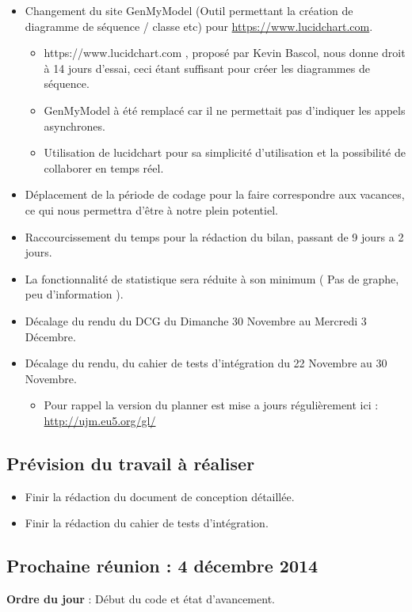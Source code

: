 \documentclass[12pt,a4paper]{article}
\begin{document}
\begin{itemize}[label = $\ast$]
	\item Changement du site GenMyModel (Outil permettant la création de diagramme de séquence / classe etc)  pour \url{https://www.lucidchart.com}.
	\begin{itemize}[label = $\circ$]
		\item https://www.lucidchart.com , proposé par Kevin Bascol, nous donne droit à 14 jours d'essai, ceci étant suffisant pour créer les diagrammes de séquence.
		\item GenMyModel à été remplacé car il ne permettait pas d'indiquer les appels asynchrones.
		\item Utilisation de lucidchart pour sa simplicité d'utilisation et la possibilité de collaborer en temps réel.
	\end{itemize}
	\item Déplacement de la période de codage pour la faire correspondre aux vacances, ce qui nous permettra d'être à notre plein potentiel.
	\item Raccourcissement du temps pour la rédaction du bilan, passant de 9 jours a 2 jours.
	\item La fonctionnalité de statistique sera réduite à son minimum ( Pas de graphe, peu d'information ).
	\item Décalage du rendu du DCG du Dimanche 30 Novembre au Mercredi 3 Décembre.
	\item Décalage du rendu, du cahier de tests d'intégration du 22 Novembre au 30 Novembre.
	\begin{itemize}[label = $\circ$]
		\item Pour rappel la version du planner est mise a jours régulièrement ici : \url{http://ujm.eu5.org/gl/}
	\end{itemize}
\end{itemize}

\subsection*{Prévision du travail à réaliser}

\begin{itemize}[label = $\ast$]
	\item Finir la rédaction du document de conception détaillée.
	\item Finir la rédaction du cahier de tests d'intégration.
\end{itemize}

\subsection*{Prochaine réunion : 4 décembre 2014}

\textbf{Ordre du jour} : Début du code et état d'avancement.\\
\end{document}
